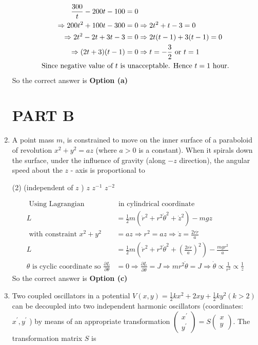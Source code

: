 \begin{enumerate}
\begin{answer}
\begin{align}
	\frac{300}{t}-200 t-100&=0 \notag\\
	\Rightarrow 200 t^{2}+100 t-300&=0 \Rightarrow 2 t^{2}+t-3=0 \notag\\
	\Rightarrow 2 t^{2}-2 t+3 t-3&=0 \Rightarrow 2 t(t-1)+3(t-1)=0 \notag\\
	\Rightarrow(2 t+3)(t-1)&=0 \Rightarrow t=-\frac{3}{2} \text { or } t=1\notag\\
	\text{Since negative value of $t$ is}&\text{ unacceptable. Hence $t=1$ hour.}\notag
	\end{align}
		So the correct answer is \textbf{Option (a)}
\end{answer}
\section{PART B}	
\item  A point mass $m$, is constrained to move on the inner surface of a paraboloid of revolution $x^{2}+y^{2}=a z$ (where $a>0$ is a constant). When it spirals down the surface, under the influence of gravity (along $-z$ direction), the angular speed about the $z$ - axis is proportional to
 \begin{tasks}(2)
	 (independent of $z$ )
	\task[\textbf{b.}] $z$
	\task[\textbf{c.}]$z^{-1}$
	\task[\textbf{d.}] $z^{-2}$
\end{tasks}
\begin{answer}
	\begin{align*}
	\text { Using Lagrangian}&\text{ in cylindrical coordinate }\\
	L&=\frac{1}{2} m\left(\dot{r}^{2}+r^{2} \dot{\theta}^{2}+\dot{z}^{2}\right)-m g z \quad\\\text{ with constraint } x^{2}+y^{2}&=a z \Rightarrow r^{2}=a z \Rightarrow \dot{z}=\frac{2 r \dot{r}}{a}\\
	 L&=\frac{1}{2} m\left(\dot{r}^{2}+r^{2} \dot{\theta}^{2}+\left(\frac{2 r \dot{r}}{a}\right)^{2}\right)-\frac{m g r^{2}}{a}\\
	\text{$\theta$ is cyclic coordinate so }\frac{\partial L}{\partial \theta}&=0 \Rightarrow \frac{\partial L}{\partial \dot{\theta}}=J \Rightarrow m r^{2} \dot{\theta}=J \Rightarrow \dot{\theta} \propto \frac{1}{r^{2}} \propto \frac{1}{z}
	\end{align*}
	So the correct answer is \textbf{Option (c)}
\end{answer}
\item  Two coupled oscillators in a potential $V(x, y)=\frac{1}{2} k x^{2}+2 x y+\frac{1}{2} k y^{2}(k>2)$ can be decoupled into two independent harmonic oscillators (coordinates: $x^{\prime}, y^{\prime}$ ) by means of an appropriate transformation $\left(\begin{array}{l}x^{\prime} \\ y^{\prime}\end{array}\right)=S\left(\begin{array}{l}x \\ y\end{array}\right)$. The transformation matrix $S$ is

\end{enumerate}
